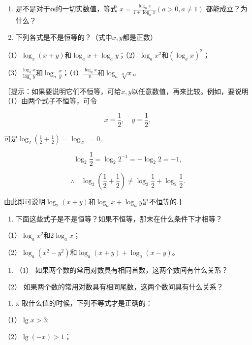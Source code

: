 \begin{enumerate}
\item
  是不是对于\(\pmb{\alpha}\)的一切实数值，等式
  \(x = \frac{\log_{n} x}{1 + \log_{n} x} (a > 0, a \neq 1)\)
  都能成立？为什么？
\item
  下列各式是不是恒等的？（式中\(x, y\)都是正数）
\end{enumerate}

（1）\(\log_x(x + y)\)和\(\log_a x + \log_a y\)；（2）\(\log_a x^2\)和\((\log_a x)^2\)；

（3）\(\frac{\log_a x}{\log_a y}\)和\(\log_a \frac{x}{y}\)；（4）\(\frac{\log_a x}{n}\)和\(\log_a \sqrt[n]{x}\)。

［提示：如果要说明它们不恒等，可给\(x, y\)以任意数值，再来比较。例如，要说明（1）由两个式子不恒等，可令

\[
x = \frac{1}{2}, \quad y = \frac{1}{2},
\]

可是\(\log_2\left(\frac{1}{2} +\frac{1}{2}\right) = \log_21 = 0,\)

\[
\log_{2} \frac{1}{2} = \log_{2} 2^{- 1} = - \log_{2} 2 = - 1,
\]

\[
\therefore \quad \log_{2} \left(\frac{1}{2} + \frac{1}{2}\right) \neq \log_{2} \frac{1}{2} + \log_{2} \frac{1}{2}.
\]

由此即可说明\(\log_2(x + y)\)和\(\log_a x + \log_a y\)是不恒等的.］

\begin{enumerate}[start=3]
\item
  下面这些式子是不是恒等？如果不恒等，那末在什么条件下才相等？
\end{enumerate}

（1）\(\log_a x^2\)和\(2\log_a x\)；

（2）\(\log_a(x^2 - y^2)\)和\(\log_a(x + y) + \log_a(x - y)\)。

\begin{enumerate}[start=4]
\item
  （1） 如果两个数的常用对数具有相同首数，这两个数间有什么关系？
\end{enumerate}

（2） 如果两个数的常用对数具有相同尾数，这两个数间具有什么关系？

\begin{enumerate}[start=5]
\item
  x 取什么值的时候，下列不等式才是正确的：
\end{enumerate}

（1）\(\lg x > 3;\)

（2）\(\lg (-x) > 1\)；

